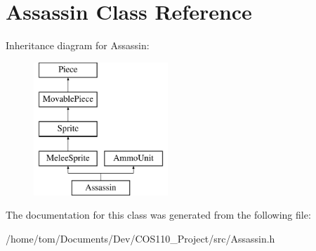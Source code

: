 \hypertarget{classAssassin}{\section{Assassin Class Reference}
\label{classAssassin}
}
Inheritance diagram for Assassin\-:\begin{figure}[H]
\begin{center}
\leavevmode
\includegraphics[height=5.000000cm]{classAssassin}
\end{center}
\end{figure}


The documentation for this class was generated from the following file\-:\begin{DoxyCompactItemize}
\item 
/home/tom/\-Documents/\-Dev/\-C\-O\-S110\-\_\-\-Project/src/Assassin.\-h\end{DoxyCompactItemize}
